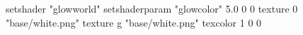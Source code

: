 setshader "glowworld"
setshaderparam "glowcolor" 5.0 0 0
   texture 0 "base/white.png"
   texture g "base/white.png"
texcolor 1 0 0

